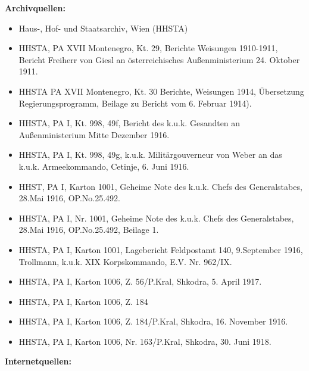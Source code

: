 \vspace{0,5cm}
\textbf{{\Large Archivquellen:}}
\begin{itemize}[label={},leftmargin=*,itemsep=0pt,parsep=10pt]
\item Haus-, Hof- und Staatsarchiv, Wien (HHSTA)
\item HHSTA, PA XVII Montenegro, Kt. 29, Berichte Weisungen 1910-1911, Bericht Freiherr von Giesl an österreichisches Außenministerium 24. Oktober 1911.
\item HHSTA PA XVII Montenegro, Kt. 30 Berichte, Weisungen 1914, Übersetzung Regierungsprogramm, Beilage zu Bericht vom 6. Februar 1914).
\item HHSTA, PA I, Kt. 998, 49f, Bericht des k.u.k. Gesandten an Außenministerium Mitte Dezember 1916.
\item HHSTA, PA I, Kt. 998, 49g, k.u.k. Militärgouverneur von Weber an das k.u.k. Armeekommando, Cetinje, 6. Juni 1916.
\item HHST, PA I, Karton 1001, Geheime Note des k.u.k. Chefs des Generalstabes, 28.Mai 1916, OP.No.25.492.
\item HHSTA, PA I, Nr. 1001, Geheime Note des k.u.k. Chefs des Generalstabes, 28.Mai 1916, OP.No.25.492, Beilage 1.
\item HHSTA, PA I, Karton 1001, Lagebericht Feldpostamt 140, 9.September 1916, Trollmann, k.u.k. XIX Korpskommando, E.V. Nr. 962/IX.
\item HHSTA, PA I, Karton 1006, Z. 56/P.Kral, Shkodra, 5. April 1917. 
\item HHSTA, PA I, Karton 1006, Z. 184
\item HHSTA, PA I, Karton 1006, Z. 184/P.Kral, Shkodra, 16. November 1916.
\item HHSTA, PA I, Karton 1006, Nr. 163/P.Kral, Shkodra, 30. Juni 1918.
\end{itemize}
\vspace{0,5cm}
\textbf{\Large{Internetquellen:}}

